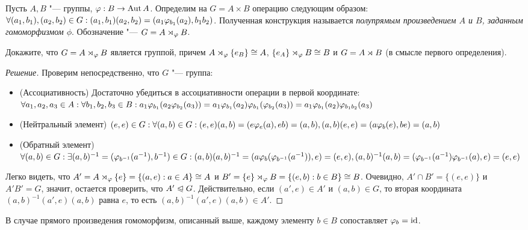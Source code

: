 \begin{definition}
	Пусть $A, B$ "--- группы, $\varphi: B \to \operatorname{Aut}{A}$. Определим на $G = A \times B$ операцию следующим образом: $\forall (a_1, b_1), (a_2, b_2) \hm\in G: (a_1, b_1)(a_2, b_2) = (a_1\phi_{b_1}(a_2), b_1b_2)$. Полученная конструкция называется \textit{полупрямым произведением $A$ и $B$, заданным гомоморфизмом $\phi$}. Обозначение "--- $G = A \rtimes_{\varphi} B$.
\end{definition}

\begin{exercise}
	Докажите, что $G = A \rtimes_{\varphi} B$ является группой, причем $A \sd_\phi \{e_B\} \hm\cong A$, $\{e_A\} \rtimes_{\varphi} B \cong B$ и $G = A \rtimes B$ (в смысле первого определения).
\end{exercise}

\begin{proof}[Решение]
	Проверим непосредственно, что $G$ "--- группа:
	\begin{itemize}
		\item (Ассоциативность) Достаточно убедиться в ассоциативности операции в первой координате: $\forall a_1, a_2, a_3 \in A: \forall b_1, b_2, b_3 \in B: a_1\phi_{b_1}(a_2\phi_{b_2}(a_3)) = a_1\phi_{b_1}(a_2)\phi_{b_1}(\phi_{b_2}(a_3)) \hm= a_1\phi_{b_1}(a_2)\phi_{b_1b_2}(a_3)$
		\item (Нейтральный элемент) $(e, e) \in G: \forall (a, b) \in G: (e, e)(a, b) \hm= (e\phi_e(a), eb) \hm= (a, b), (a, b)(e, e) = (a\phi_b(e), be) = (a, b)$
		\item (Обратный элемент) $\forall (a, b) \in G: \exists (a, b)^{-1} = (\phi_{b^{-1}}(a^{-1}), b^{-1}) \hm\in G: (a, b)(a, b)^{-1} = (a\phi_b(\phi_{b^{-1}}(a^{-1})), e) = (e, e), (a, b)^{-1}(a, b) \hm= (\phi_{b^{-1}}(a^{-1})\phi_{b^{-1}}(a), e) = (e, e)$
	\end{itemize}
	
	Легко видеть, что $A' = A \rtimes_{\varphi} \{e\} = \{(a, e): a \in A\} \cong A$ и $B' \hm= \{e\} \sd_\phi B \hm = \{(e, b): b \hm\in B\} \cong B$. Очевидно, $A' \cap B' = \{(e, e)\}$ и $A'B' = G$, значит, остается проверить, что $A' \trianglelefteqslant G$. Действительно, если $(a', e) \in A'$ и $(a, b) \in G$, то вторая координата $(a, b)^{-1}(a', e)(a, b)$ равна $e$, то есть $(a, b)^{-1}(a', e)(a, b) \in A'$.
\end{proof}

\begin{note}
	В случае прямого произведения гомоморфизм, описанный выше, каждому элементу $b \in B$ сопоставляет $\varphi_b = \operatorname{id}$.
\end{note}
